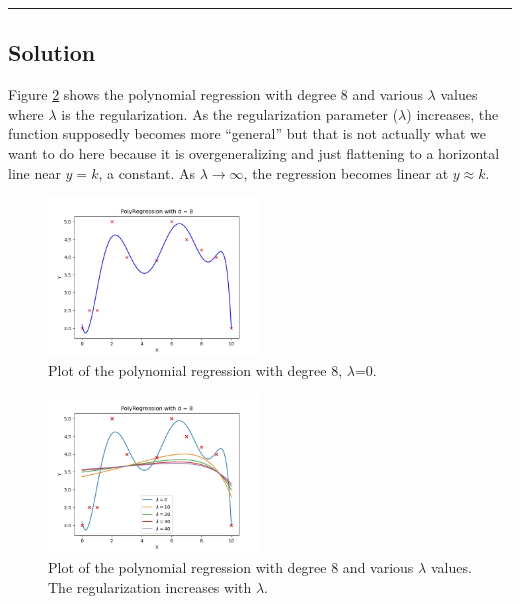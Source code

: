\documentclass{article}
\begin{document}
\begin{aprob}
    \rule{\textwidth}{0.25pt}

    \subsection*{Solution}

    Figure \ref{fig:poly_ref_d8} shows the polynomial regression with degree 8 and various $\lambda$ values where $\lambda$ is the regularization. As the regularization parameter ($\lambda$) increases, the function supposedly becomes more ``general'' but that is not actually what we want to do here because it is overgeneralizing and just flattening to a horizontal line near $y=k$, a constant. As $\lambda \rightarrow \infty$, the regression becomes linear at $y \approx k$.

    \begin{figure}
        \centering
        \includegraphics[width=0.5\textwidth]{../../../hw1-code/homeworks/poly_regression/fig1.jpg}
        \caption{Plot of the polynomial regression with degree 8, $\lambda$=0.}\label{fig:poly_reg}
    \end{figure}

    \begin{figure}
        \centering
        \includegraphics[width=0.5\textwidth]{../../../hw1-code/homeworks/poly_regression/fig2.jpg}
        \caption{Plot of the polynomial regression with degree 8 and various $\lambda$ values. The regularization increases with $\lambda$.} \label{fig:poly_ref_d8}
    \end{figure}


\end{aprob}
\end{document}
